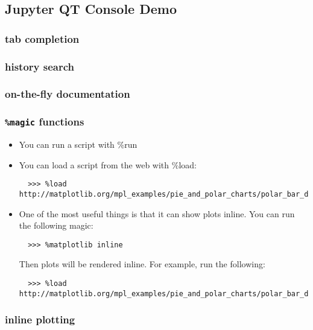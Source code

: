 \documentclass[10pt,article]{article}
\begin{document}
\subsection{Jupyter QT Console Demo}
\label{sec:org13655cd}
\subsubsection{tab completion}
\label{sec:orgadd2f3b}
\subsubsection{history search}
\label{sec:org46e104c}
\subsubsection{on-the-fly documentation}
\label{sec:org3fed3c1}
\subsubsection{\texttt{\%magic} functions}
\label{sec:org868002b}

\begin{itemize}
\item You can run a script with \%run
\item You can load a script from the web with \%load:

\begin{verbatim}
  >>> %load http://matplotlib.org/mpl_examples/pie_and_polar_charts/polar_bar_demo.py
\end{verbatim}

\item One of the most useful things is that it can show plots inline. You can run
the following magic:

\begin{verbatim}
  >>> %matplotlib inline
\end{verbatim}

Then plots will be rendered inline. For example, run the following:

\begin{verbatim}
  >>> %load http://matplotlib.org/mpl_examples/pie_and_polar_charts/polar_bar_demo.py
\end{verbatim}
\end{itemize}
\subsubsection{inline plotting}
\label{sec:orgabf96bb}
\end{document}
